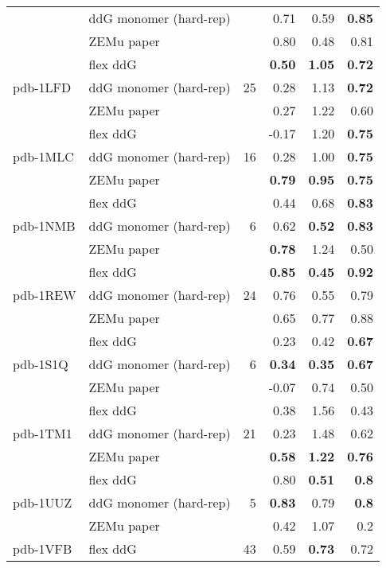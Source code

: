 \begin{longtable}{llrrrr}
 & ddG monomer (hard-rep) & & 0.71 & 0.59 & \textbf{0.85}  \\
 & ZEMu paper & & 0.80 & 0.48 & 0.81  \\
\hline
 \multirow{ 3}{*}{pdb-1LFD} & flex ddG & \multirow{ 3}{*}{25} & \textbf{0.50} & \textbf{1.05} & \textbf{0.72}  \\
 & ddG monomer (hard-rep) & & 0.28 & 1.13 & \textbf{0.72}  \\
 & ZEMu paper & & 0.27 & 1.22 & 0.60  \\
\hline
 \multirow{ 3}{*}{pdb-1MLC} & flex ddG & \multirow{ 3}{*}{16} & -0.17 & 1.20 & \textbf{0.75}  \\
 & ddG monomer (hard-rep) & & 0.28 & 1.00 & \textbf{0.75}  \\
 & ZEMu paper & & \textbf{0.79} & \textbf{0.95} & \textbf{0.75}  \\
\hline
 \multirow{ 3}{*}{pdb-1NMB} & flex ddG & \multirow{ 3}{*}{6} & 0.44 & 0.68 & \textbf{0.83}  \\
 & ddG monomer (hard-rep) & & 0.62 & \textbf{0.52} & \textbf{0.83}  \\
 & ZEMu paper & & \textbf{0.78} & 1.24 & 0.50  \\
\hline
 \multirow{ 3}{*}{pdb-1REW} & flex ddG & \multirow{ 3}{*}{24} & \textbf{0.85} & \textbf{0.45} & \textbf{0.92}  \\
 & ddG monomer (hard-rep) & & 0.76 & 0.55 & 0.79  \\
 & ZEMu paper & & 0.65 & 0.77 & 0.88  \\
\hline
 \multirow{ 3}{*}{pdb-1S1Q} & flex ddG & \multirow{ 3}{*}{6} & 0.23 & 0.42 & \textbf{0.67}  \\
 & ddG monomer (hard-rep) & & \textbf{0.34} & \textbf{0.35} & \textbf{0.67}  \\
 & ZEMu paper & & -0.07 & 0.74 & 0.50  \\
\hline
 \multirow{ 3}{*}{pdb-1TM1} & flex ddG & \multirow{ 3}{*}{21} & 0.38 & 1.56 & 0.43  \\
 & ddG monomer (hard-rep) & & 0.23 & 1.48 & 0.62  \\
 & ZEMu paper & & \textbf{0.58} & \textbf{1.22} & \textbf{0.76}  \\
\hline
 \multirow{ 3}{*}{pdb-1UUZ} & flex ddG & \multirow{ 3}{*}{5} & 0.80 & \textbf{0.51} & \textbf{0.8}  \\
 & ddG monomer (hard-rep) & & \textbf{0.83} & 0.79 & \textbf{0.8}  \\
 & ZEMu paper & & 0.42 & 1.07 & 0.2  \\
\hline
 \multirow{ 3}{*}{pdb-1VFB} & flex ddG & \multirow{ 3}{*}{43} & 0.59 & \textbf{0.73} & 0.72  \\

\end{longtable}
